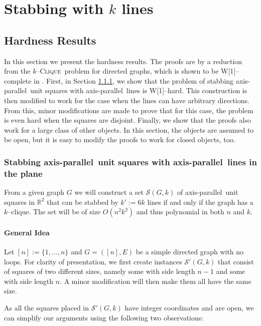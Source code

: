 \documentclass[12pt]{article}
\newcommand{\cclass}[1]{{#1}}
\newcommand{\problem}[1]{\textsc{#1}}
\newcommand{\wone}{\cclass{W[1]}}
\newcommand{\clique}{\problem{Clique}}
\newcommand{\ap}{a.p.\ }
\renewcommand{\ap}{axis-parallel\ }
\newcommand{\Rtwo}{\mathbb{R}^2}
\newcommand{\calS}{\mathcal{S}}
\begin{document}
\section{Stabbing with $k$ lines}

\subsection{Hardness Results}\label{section:Hardness}
In this section we present the hardness results. The proofs are by a reduction from the $k$--\clique\ problem for directed graphs, which is shown to be \wone--complete in \cite{DF99}. First, in Section \ref{sssec:wonehardUnitSquaresAP}, we show that the problem of stabbing \ap unit squares with \ap lines is \wone--hard. This construction is then modified to work for the case when the lines can have arbitrary directions. From this, minor modifications are made to prove that for this case, the problem is even hard when the squares are disjoint. Finally, we show that the proofs also work for a large class of other objects. In this section, the objects are assumed to be open, but it is easy to modify the proofs to work for closed objects, too.

\subsubsection{Stabbing \ap unit squares with \ap lines in the
  plane}\label{sssec:wonehardUnitSquaresAP}

From a given graph $G$ we will construct a set $\calS(G, k)$ of \ap unit squares in $\Rtwo$ that can be stabbed by $k' := 6k$ lines if and only if the graph has a $k$--clique. The set will be of size $O(n^2k^2)$ and thus polynomial in both $n$ and $k$.

\paragraph{General Idea}
Let $[n] := \{1, \dots, n \}$ and $G = ([n], E)$ be a simple directed graph with no loops. For clarity of presentation, we first create instances $\calS'(G, k)$ that consist of squares of two different sizes, namely some with side length $n-1$ and some with side length $n$. A minor modification will then make them all have the same size. 

As all the squares placed in $\calS'(G, k)$ have integer coordinates and are open, we can simplify our arguments using the following two observations:
\end{document}
